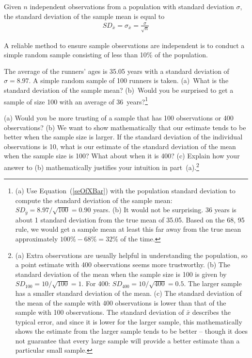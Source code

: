 \begin{termBox}{
Given $n$ independent observations from a population with standard deviation $\sigma$, the standard deviation of the sample mean is equal to \vspace{-1mm}
\begin{eqnarray}
SD_{\bar{x}} = \sigma_{\bar{x}} =  \frac{\sigma}{\sqrt{n}}
\label{seOfXBar}
\end{eqnarray}\vspace{-3mm}

A reliable method to ensure sample observations are independent is to conduct a simple random sample consisting of less than 10\% of the population.}
\end{termBox}

\begin{exercise}
The average of the runners' ages is 35.05 years with a standard deviation of $\sigma = 8.97$. A simple random sample of 100 runners is taken.  (a)~What is the standard deviation of the sample mean? (b)~Would you be surprised to get a sample of size 100 with an average of 36~years?\footnote{(a) Use Equation~(\ref{seOfXBar}) with the population standard deviation to compute the standard deviation of the sample mean: $SD_{\bar{y}} = 8.97/\sqrt{100} = 0.90$ years. (b) It would not be surprising. 36 years is about 1 standard deviation from the true mean of 35.05. Based on the 68, 95 rule, we would get a sample mean at least this far away from the true mean approximately $100\% - 68\% = 32\%$ of the time.}
\end{exercise}


\begin{exercise}
(a) Would you be more trusting of a sample that has 100 observations or 400 observations? (b) We want to show mathematically that our estimate tends to be better when the sample size is larger. If the standard deviation of the individual observations is 10, what is our estimate of the standard deviation of the mean when the sample size is 100? What about when it is 400? (c) Explain how your answer to (b) mathematically justifies your intuition in part~(a).\footnote{(a) Extra observations are usually helpful in understanding the population, so a point estimate with 400 observations seems more trustworthy. (b) The standard deviation of the mean when the sample size is 100 is given by $SD_{100} = 10/\sqrt{100} = 1$. For 400: $SD_{400} = 10/\sqrt{400} = 0.5$. The larger sample has a smaller standard deviation of the mean. (c) The standard deviation of the mean of the sample with 400 observations is lower than that of the sample with 100 observations. The standard deviation of $\bar{x}$ describes the typical error, and since it is lower for the larger sample, this mathematically shows the estimate from the larger sample tends to be better -- though it does not guarantee that every large sample will provide a better estimate than a particular small sample.}
\end{exercise}


